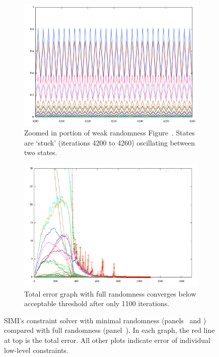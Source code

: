 \begin{landscape}
\begin{figure}
  \begin{subfigure}[t]{0.6\textwidth}
    \centering
    \includegraphics[width=0.8\linewidth]{img/jessica-norandom-closeup.pdf}
    \caption{Zoomed in portion of weak randomness
      Figure~. States are `stuck'
      (iterations 4200 to 4260) oscillating between two states.}
    \label{fig:jessica-closeup}
  \end{subfigure}
  \hspace{0.03\textwidth}
  \begin{subfigure}[t]{0.6\textwidth}
    \centering
    \includegraphics[width=0.8\linewidth]{img/jessica-with-fullrandom.pdf}
    \caption{Total error graph with full randomness converges below
      acceptable threshold after only 1100 iterations.}
    \label{fig:jessica-fullrandom}
  \end{subfigure}
  \caption[Constraint Solver Minimal vs. Full Randomness]{SIMI's
    constraint solver with minimal randomness
    (panels~\textit{} and
    \textit{}) compared with full
    randomness (panel~\textit{}). In
    each graph, the red line at top is the total error. All other
    plots indicate error of individual low-level constraints.}
  \label{fig:jessica}
\end{figure}
\end{landscape}
